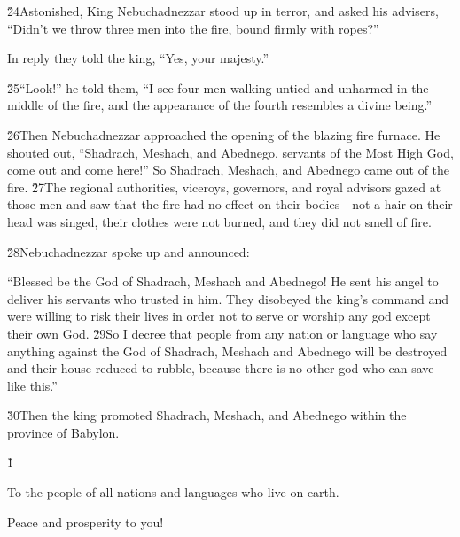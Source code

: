 \v{24}Astonished, King Nebuchadnezzar stood up in terror, and asked his advisers, ``Didn't we throw three men into the fire, bound firmly with ropes?''

In reply they told the king, ``Yes, your majesty.''

\v{25}``Look!'' he told them, ``I see four men walking untied and unharmed in the middle of the fire, and the appearance of the fourth resembles a divine being.''

\v{26}Then Nebuchadnezzar approached the opening of the blazing fire furnace. He shouted out, ``Shadrach, Meshach, and Abednego, servants of the Most High God, come out and come here!'' So Shadrach, Meshach, and Abednego came out of the fire. \v{27}The regional authorities, viceroys, governors, and royal advisors gazed at those men and saw that the fire had no effect on their bodies---not a hair on their head was singed, their clothes were not burned, and they did not smell of fire.

\v{28}Nebuchadnezzar spoke up and announced:

\begin{poetry}
\poeml ``Blessed be the God of Shadrach, Meshach and Abednego! He sent his angel to deliver his servants who trusted in him. They disobeyed the king's command and were willing to risk their lives in order not to serve or worship any god except their own God. \v{29}So I decree that people from any nation or language who say anything against the God of Shadrach, Meshach and Abednego will be destroyed and their house reduced to rubble, because there is no other god who can save like this.''
\end{poetry}

\v{30}Then the king promoted Shadrach, Meshach, and Abednego within the province of Babylon.

\v{1}



To the people of all nations and languages who live on earth.

Peace and prosperity to you!

